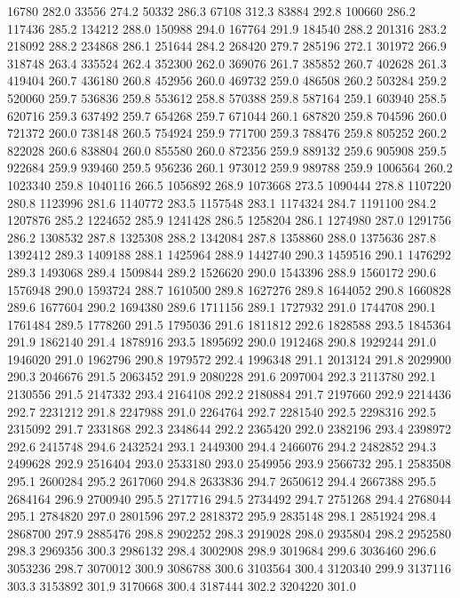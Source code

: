 16780 282.0
33556 274.2
50332 286.3
67108 312.3
83884 292.8
100660 286.2
117436 285.2
134212 288.0
150988 294.0
167764 291.9
184540 288.2
201316 283.2
218092 288.2
234868 286.1
251644 284.2
268420 279.7
285196 272.1
301972 266.9
318748 263.4
335524 262.4
352300 262.0
369076 261.7
385852 260.7
402628 261.3
419404 260.7
436180 260.8
452956 260.0
469732 259.0
486508 260.2
503284 259.2
520060 259.7
536836 259.8
553612 258.8
570388 259.8
587164 259.1
603940 258.5
620716 259.3
637492 259.7
654268 259.7
671044 260.1
687820 259.8
704596 260.0
721372 260.0
738148 260.5
754924 259.9
771700 259.3
788476 259.8
805252 260.2
822028 260.6
838804 260.0
855580 260.0
872356 259.9
889132 259.6
905908 259.5
922684 259.9
939460 259.5
956236 260.1
973012 259.9
989788 259.9
1006564 260.2
1023340 259.8
1040116 266.5
1056892 268.9
1073668 273.5
1090444 278.8
1107220 280.8
1123996 281.6
1140772 283.5
1157548 283.1
1174324 284.7
1191100 284.2
1207876 285.2
1224652 285.9
1241428 286.5
1258204 286.1
1274980 287.0
1291756 286.2
1308532 287.8
1325308 288.2
1342084 287.8
1358860 288.0
1375636 287.8
1392412 289.3
1409188 288.1
1425964 288.9
1442740 290.3
1459516 290.1
1476292 289.3
1493068 289.4
1509844 289.2
1526620 290.0
1543396 288.9
1560172 290.6
1576948 290.0
1593724 288.7
1610500 289.8
1627276 289.8
1644052 290.8
1660828 289.6
1677604 290.2
1694380 289.6
1711156 289.1
1727932 291.0
1744708 290.1
1761484 289.5
1778260 291.5
1795036 291.6
1811812 292.6
1828588 293.5
1845364 291.9
1862140 291.4
1878916 293.5
1895692 290.0
1912468 290.8
1929244 291.0
1946020 291.0
1962796 290.8
1979572 292.4
1996348 291.1
2013124 291.8
2029900 290.3
2046676 291.5
2063452 291.9
2080228 291.6
2097004 292.3
2113780 292.1
2130556 291.5
2147332 293.4
2164108 292.2
2180884 291.7
2197660 292.9
2214436 292.7
2231212 291.8
2247988 291.0
2264764 292.7
2281540 292.5
2298316 292.5
2315092 291.7
2331868 292.3
2348644 292.2
2365420 292.0
2382196 293.4
2398972 292.6
2415748 294.6
2432524 293.1
2449300 294.4
2466076 294.2
2482852 294.3
2499628 292.9
2516404 293.0
2533180 293.0
2549956 293.9
2566732 295.1
2583508 295.1
2600284 295.2
2617060 294.8
2633836 294.7
2650612 294.4
2667388 295.5
2684164 296.9
2700940 295.5
2717716 294.5
2734492 294.7
2751268 294.4
2768044 295.1
2784820 297.0
2801596 297.2
2818372 295.9
2835148 298.1
2851924 298.4
2868700 297.9
2885476 298.8
2902252 298.3
2919028 298.0
2935804 298.2
2952580 298.3
2969356 300.3
2986132 298.4
3002908 298.9
3019684 299.6
3036460 296.6
3053236 298.7
3070012 300.9
3086788 300.6
3103564 300.4
3120340 299.9
3137116 303.3
3153892 301.9
3170668 300.4
3187444 302.2
3204220 301.0
